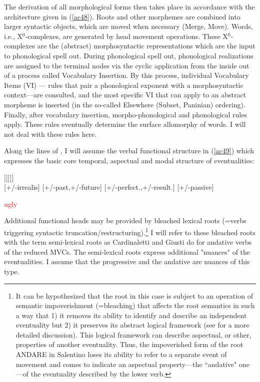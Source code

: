 \documentclass[output=paper]{langscibook}
\begin{document}
The derivation of all morphological forms then takes place in accordance with the architecture given in (\ref{ac48}). Roots and other morphemes are combined into larger syntactic objects, which are moved when necessary (Merge, Move). Words, i.e., X$^0$-complexes, are generated by head movement operations. These X$^0$-complexes are the (abstract) morphosyntactic representations which are the input to phonological spell out.  During phonological spell out, phonological realizations are assigned to the terminal nodes via the cyclic application from the inside out of a process called Vocabulary Insertion. By this process, individual Vocabulary Items (VI) — rules that pair a phonological exponent with a morphosyntactic context—are consulted, and the most specific VI that can apply to an abstract morpheme is inserted (in the so-called Elsewhere (Subset, Paninian) ordering).  Finally, after vocabulary insertion, morpho-phonological and phonological rules apply.  These rules eventually determine the surface allomorphy of words.  I will not deal with these rules here.

Along the lines of \cite{wurmbrand2015}, I will assume the verbal functional structure in (\ref{ac49}) which expresses the basic core temporal, aspectual and modal structure of eventualities:

\ea \label{ac49}\gll [MoodP Mood$^0$ [TenseP T$^0$ [AspP Asp$^0$ [VoiceP Voice$^0$ [vP v$^0$ [√p √Root$^0$ ]]]]]]\\
\footnotesize {} [+/-irrealis] {} [+/-past,+/-future] {}  [+/-perfect.,+/-result.] {} [+/-passive] {} {} {} {} {}\\
\z

\normalsize
\textcolor{red}{ugly}

Additional functional heads may be provided by bleached lexical roots (=verbs triggering syntactic truncation/restructuring).\footnote{It can be hypothesized that the root in this case is subject to an operation of semantic impoverishment (=bleaching) that affects the root semantics in such a way that 1) it removes its ability to identify and describe an independent eventuality but 2) it preserves its abstract logical framework (see \cite{roberts2010a} for a more detailed discussion).  This logical framework can describe aspectual, or other, properties of another eventuality.  Thus, the impoverished form of the root ANDARE in Salentino loses its ability to refer to a separate event of movement and comes to indicate an aspectual property—the “andative" one—of the eventuality described by the lower verb.}  I will refer to these bleached roots with the term semi-lexical roots as Cardinaletti and Giusti do for andative verbs of the reduced MVCs. The semi-lexical roots express additional "nuances" of the eventualities.   I assume that the progressive and the andative are nuances of this type.
\end{document}
